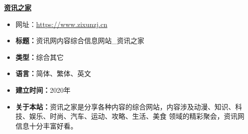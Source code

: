 \textbf{\href{https://www.zixunzj.cn}{资讯之家}}
\begin{itemize}
\item 网址：\href{https://www.zixunzj.cn}{https://www.zixunzj.cn}
\item \textbf{标题：}资讯网内容综合信息网站_资讯之家
\item \textbf{类型：}综合其它
\item \textbf{ 语言：}简体、繁体、英文
\item \textbf{建立时间：}2020年
\item \textbf{关于本站：}资讯之家是分享各种内容的综合网站，内容涉及动漫、知识、科技、娱乐、时尚、汽车、运动、攻略、生活、美食 领域的精彩聚会，资讯网信息十分丰富好看。
\end{itemize}


